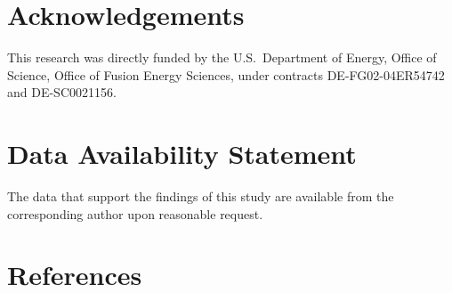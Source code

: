 \documentclass[12pt,prb,aps]{revtex4-1}
\begin{document}
\section*{Acknowledgements}
This research was directly funded by the U.S.\ Department of Energy, Office of Science, Office of Fusion Energy Sciences,  under  contracts DE-FG02-04ER54742 and DE-SC0021156. 
 
\section*{Data Availability Statement}
The data that support the findings of this study are available from the corresponding author upon reasonable request.

\section*{References}
\end{document}
